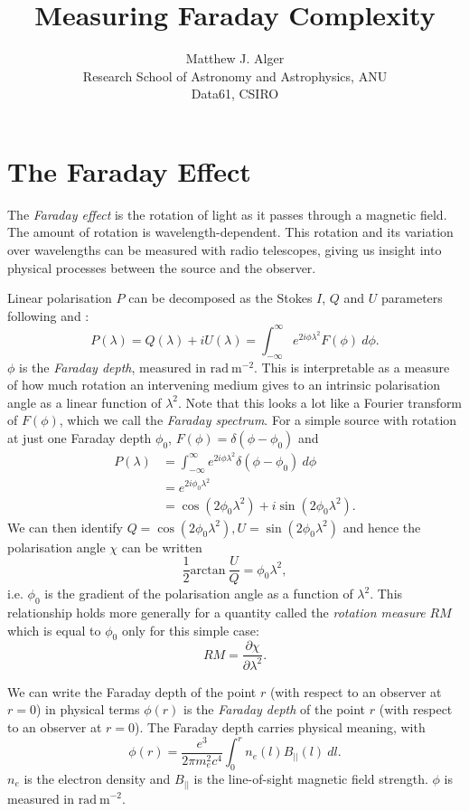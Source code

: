 \documentclass[a4paper]{article}
\title{Measuring Faraday Complexity}
\author{Matthew J. Alger\\{\small Research School of Astronomy and Astrophysics, ANU}\\{\small Data61, CSIRO}}
\newcommand{\defn}[1]{\emph{#1}}
\begin{document}
    \maketitle

    \section{The Faraday Effect}

    The \defn{Faraday effect} is the rotation of light as it passes through a magnetic field. The amount of rotation is wavelength-dependent. This rotation and its variation over wavelengths can be measured with radio telescopes, giving us insight into physical processes between the source and the observer.

    Linear polarisation $P$ can be decomposed as the Stokes $I$, $Q$ and $U$ parameters following \citet{burn66depolarization} and \citet{bell12faraday}:
    \[
        P(\lambda) = Q(\lambda) + iU(\lambda) = \int_{-\infty}^{\infty} e^{2i\phi\lambda^2} F(\phi)\ d\phi.
    \]
    $\phi$ is the \defn{Faraday depth}, measured in $\mathrm{rad}\ \mathrm{m}^{-2}$. This is interpretable as a measure of how much rotation an intervening medium gives to an intrinsic polarisation angle as a linear function of $\lambda^2$. Note that this looks a lot like a Fourier transform of $F(\phi)$, which we call the \defn{Faraday spectrum}. For a simple source with rotation at just one Faraday depth $\phi_0$, $F(\phi) = \delta(\phi - \phi_0)$ and
    \begin{align*}
        P(\lambda) &= \int_{-\infty}^{\infty} e^{2i\phi\lambda^2} \delta(\phi - \phi_0)\ d\phi\\
            &= e^{2i\phi_0\lambda^2}\\
            &= \cos (2\phi_0\lambda^2) + i \sin (2\phi_0\lambda^2).
    \end{align*}
    We can then identify $Q = \cos(2 \phi_0 \lambda^2), U = \sin(2 \phi_0 \lambda^2)$ and hence the polarisation angle $\chi$ can be written
    \[
        \frac{1}{2} \mathrm{arctan}\ \frac{U}{Q} = \phi_0 \lambda^2,
    \]
    i.e. $\phi_0$ is the gradient of the polarisation angle as a function of $\lambda^2$. This relationship holds more generally for a quantity called the \defn{rotation measure} $RM$ which is equal to $\phi_0$ only for this simple case:
    \[
        RM = \frac{\partial \chi}{\partial \lambda^2}.
    \]

    We can write the Faraday depth of the point $r$ (with respect to an observer at $r = 0$) in physical terms $\phi(r)$ is the \defn{Faraday depth} of the point $r$ (with respect to an observer at $r = 0$). The Faraday depth carries physical meaning, with
    \[
        \phi(r) = \frac{e^3}{2\pi m_e^2 c^4} \int_0^r n_e(l) B_{||}(l)\ dl.
    \]
    $n_e$ is the electron density and $B_{||}$ is the line-of-sight magnetic field strength. $\phi$ is measured in $\mathrm{rad}\ \mathrm{m}^{-2}$.
\end{document}
